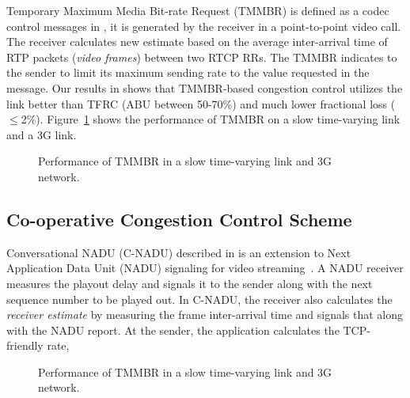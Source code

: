 Temporary Maximum Media Bit-rate Request (TMMBR) is defined as a codec control
messages in \cite{rfc5104}, it is generated by the receiver in a
point-to-point video call. The receiver calculates new estimate based on the
average inter-arrival time of RTP packets (\emph{video frames}) between two
RTCP RRs. The TMMBR indicates to the sender to limit its maximum sending rate
to the value requested in the message. Our results in  shows
that TMMBR-based congestion control utilizes the link better than TFRC (ABU
between 50-70\%) and much lower fractional loss ($\le$2\%).
Figure~\ref{fig:tmmbr} shows the performance of TMMBR on a slow time-varying
link and a 3G link.

\begin{figure}
  \centerline{
  }
  \caption{Performance of TMMBR in a slow time-varying link and 3G network.}
  \label{fig:tmmbr}
\end{figure}

\subsection{Co-operative Congestion Control Scheme}

Conversational NADU (C-NADU) described in  is an extension to
Next Application Data Unit (NADU) signaling for video
streaming~\cite{nadu.1070341,nadu.1530486}. A NADU receiver measures the
playout delay and signals it to the sender along with the next sequence number
to be played out. In C-NADU, the receiver also calculates the \emph{receiver
estimate} by measuring the frame inter-arrival time and signals that along
with the NADU report. At the sender, the application calculates the
TCP-friendly rate,

\begin{figure}
  \centerline{
  }
  \caption{Performance of TMMBR in a slow time-varying link and 3G network.}
  \label{fig:cnadu}
\end{figure}
